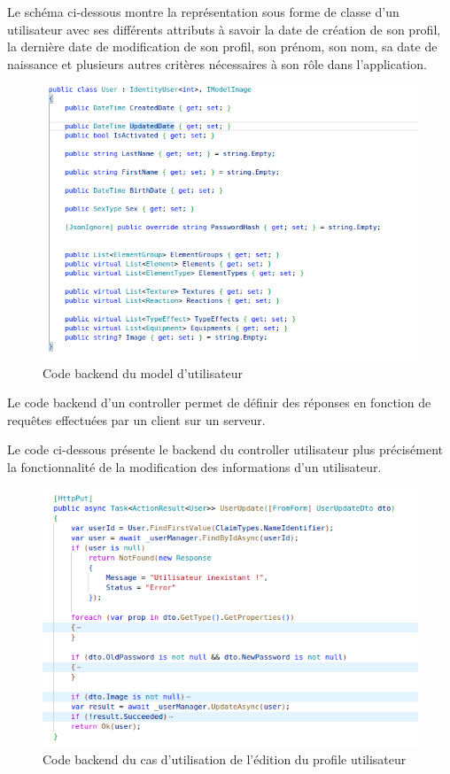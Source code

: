 Le schéma ci-dessous montre la représentation sous forme de classe d'un utilisateur avec ses différents attributs à savoir la date de création de son profil, la dernière date de modification de son profil, son prénom, son nom, sa date de naissance et plusieurs autres critères nécessaires à son rôle dans l'application.
\begin{figure}[H]
	\centering
	\includegraphics[width=1\textwidth]{img/codeuu}
	\caption{Code backend du model d'utilisateur}
	\label{fig:mesh1}
\end{figure}

Le code backend d'un controller permet de définir des réponses en fonction de requêtes effectuées par un client sur un serveur.

Le code ci-dessous présente le backend du controller utilisateur plus précisément la fonctionnalité de la modification des informations d'un utilisateur.

\begin{figure}[H]
	\centering
	\includegraphics[width=1\textwidth]{img/codeuup}
	\caption{Code backend du cas d'utilisation de l'édition du profile utilisateur}
	\label{fig:mesh1}
\end{figure}

